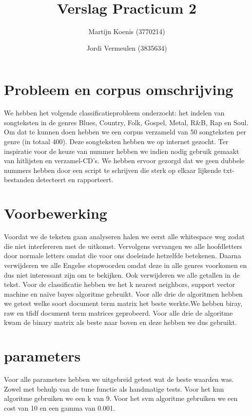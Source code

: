 \documentclass[a4paper,oneside]{article}
\begin{document}
\title{Verslag Practicum 2}
\author{Martijn Koenis (3770214) \and Jordi Vermeulen (3835634)}
\date{}
\maketitle


\begin{abstract}
\end{abstract}


\section{Probleem en corpus omschrijving}
We hebben het volgende classificatieprobleem onderzocht: het indelen van songteksten in de genres Blues, Country, Folk, Gospel, Metal, R\&B, Rap en Soul.  Om dat te kunnen doen hebben we een corpus verzameld van 50 songteksten per genre (in totaal 400). Deze songteksten hebben we op internet gezocht. Ter inspiratie voor de keuze van nummer hebben we indien nodig gebruik gemaakt van hitlijsten en verzamel-CD's. We hebben ervoor gezorgd dat we geen dubbele nummers hebben door een script te schrijven die sterk op elkaar lijkende txt-bestanden detecteert en rapporteert.

\section{Voorbewerking}
Voordat we de teksten gaan analyseren halen we eerst alle whitespace weg zodat die niet interfereren met de uitkomst. Vervolgens vervangen we alle hoofdletters door normale letters omdat die voor ons doeleinde hetzelfde betekenen. Daarna verwijderen we alle Engelse stopwoorden omdat deze in alle genres voorkomen en dus niet interessant zijn om te bekijken. Ook verwijderen we alle getallen in de tekst. Voor de classificatie hebben we het k nearest neighbors, support vector machine en na\"ive bayes algoritme gebruikt. Voor alle drie de algoritmen hebben we getest welke soort document term matrix het beste werkte.We hebben biray, raw en tfidf document term matrices geprobeerd. Voor alle drie de algoritme kwam de binary matrix als beste naar boven en  deze hebben we dus gebruikt. 

\section{parameters}
Voor alle parameters hebben we uitgebreid getest wat de beste waarden was. Zowel met behulp van de tune functie als handmatige tests. Voor het knn algoritme gebruiken we een k van 9. Voor het svm algoritme gebruiken we een cost van 10 en een gamma van 0.001. 
\end{document}
